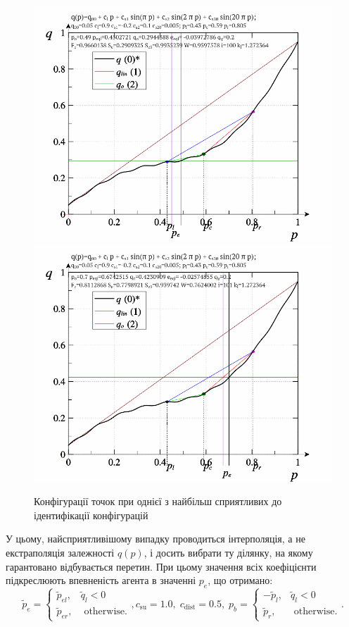 \documentclass[a4paper,13pt]{atuaref}
\newlength\TW
\begin{document}
\begin{figure}[htb!]
  \centerline{
    \includegraphics[width=49\TW]{p3/p/pq_sin-p_pq_po=049.png}
    \hfill
    \includegraphics[width=49\TW]{p3/p/pq_sin-p_pq_po=070.png}
  }
  \caption{Конфігурації точок при однієї з найбільш сприятливих до ідентифікації конфігурацій}
  \label{atu:f:pq_4}
\end{figure}

У цьому, найсприятливішому випадку проводиться інтерполяція, а не екстраполяція
залежності $ q(p)$, і досить вибрати ту ділянку, на якому гарантовано
відбувається перетин. При цьому значення всіх коефіцієнти підкреслюють
впевненість агента в значенні $ p_e $, що отримано:
%
\begin{equation}
  \tilde{p}_e
  =
  \begin{cases}
    \tilde{p}_{el}, & \tilde{q}_l < 0
    \\
    \tilde{p}_{er}, & \text{ otherwise}.
  \end{cases}
  ,
  c_\mathrm{su} = 1.0, \;  c_\mathrm{dist} = 0.5,  \;
  p_b =
  \begin{cases}
    -\tilde{p}_l, & \tilde{q}_l < 0
    \\
    \tilde{p}_r, & \text{ otherwise}.
  \end{cases}.
  \label{atu:eq:pr_e4}
\end{equation}
\end{document}
